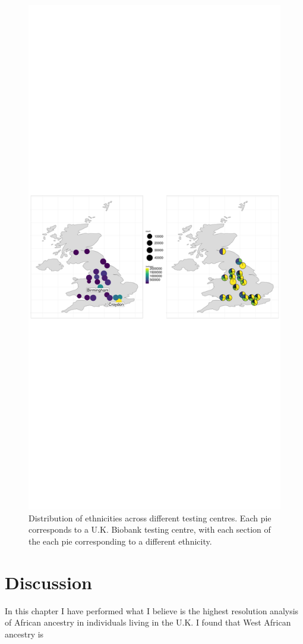 \begin{figure}
    \centering
    \includegraphics[width=1.0\textwidth]{../images/chapter3/SF_props_pie_chart.pdf}
    \caption{Distribution of ethnicities across different testing centres. Each pie corresponds to a U.K. Biobank testing centre, with each section of the each pie corresponding to a different ethnicity.}
    \label{fig:country_of_origin_allInds}
\end{figure}

\section{Discussion}

In this chapter I have performed what I believe is the highest resolution analysis of African ancestry in individuals living in the U.K. I found that West African ancestry is 



